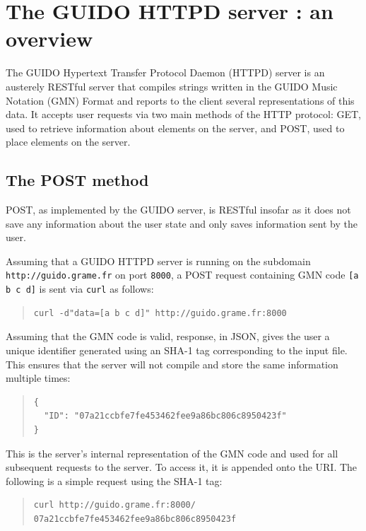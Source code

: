 \documentclass{article}
\newcommand{\verburl}[1]{
\begin{quote}
\begingroup
\fontsize{7.5pt}{12pt}\selectfont
#1
\endgroup
\end{quote}
}
\newcommand{\guidosize}{6pt}
\begin{document}
\section{The GUIDO HTTPD server : an overview}\label{section:overview}
The GUIDO Hypertext Transfer Protocol Daemon (HTTPD) server is an austerely RESTful server that compiles strings written in the GUIDO Music Notation (GMN) Format and reports to the client several representations of this data.  It accepts user requests via two main methods of the HTTP protocol: GET, used to retrieve information about elements on the server, and POST, used to place elements on the server.
\subsection{The POST method}\label{subsection:post}
POST, as implemented by the GUIDO server, is RESTful insofar as it does not save any information about the user state and only saves information sent by the user.\par
Assuming that a GUIDO HTTPD server is running on the subdomain \break \verb=http://guido.grame.fr= on port \verb=8000=, a POST request containing GMN code \verb=[a b c d]= is sent via \verb=curl= as follows:
\begin{quote}
\begingroup
\fontsize{\guidosize}{12pt}\selectfont
\begin{verbatim}
curl -d"data=[a b c d]" http://guido.grame.fr:8000
\end{verbatim}
\endgroup
\end{quote}
Assuming that the GMN code is valid, response, in JSON, gives the user a unique identifier generated using an SHA-1 tag corresponding to the input file.  This ensures that the server will not compile and store the same information multiple times:
\begin{quote}
\begingroup
\fontsize{\guidosize}{12pt}\selectfont
\begin{verbatim}
{
  "ID": "07a21ccbfe7fe453462fee9a86bc806c8950423f"
}
\end{verbatim}
\endgroup
\end{quote}
This is the server's internal representation of the GMN code and used for all subsequent requests to the server.  To access it, it is appended onto the URI.  The following is a simple request using the SHA-1 tag:
\begin{quote}
\begingroup
\fontsize{\guidosize}{12pt}\selectfont
\begin{verbatim}
curl http://guido.grame.fr:8000/
07a21ccbfe7fe453462fee9a86bc806c8950423f
\end{verbatim}
\endgroup
\end{quote}
\end{document}

